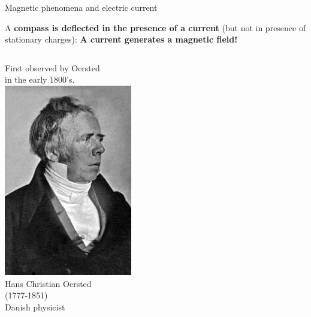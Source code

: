\begin{frame}{Magnetic phenomena and electric current}

A {\bf compass is deflected in the presence of a current}
(but not in presence of stationary charges):
 {\bf A current generates a magnetic field!}\\

\begin{columns}
  \begin{column}{0.40\textwidth}
    \begin{center}
      {\small
        First observed by Oersted\\ in the early 1800's.\\
       \includegraphics[width=0.60\textwidth]{./images/people/orsted.jpg}\\
        Hans Christian Oersted\\ (1777-1851)\\Danish physicist\\
      }
    \end{center}
  \end{column}
  \begin{column}{0.60\textwidth}
    \begin{center}

\end{center}
\end{column}
\end{columns}
\end{frame}
